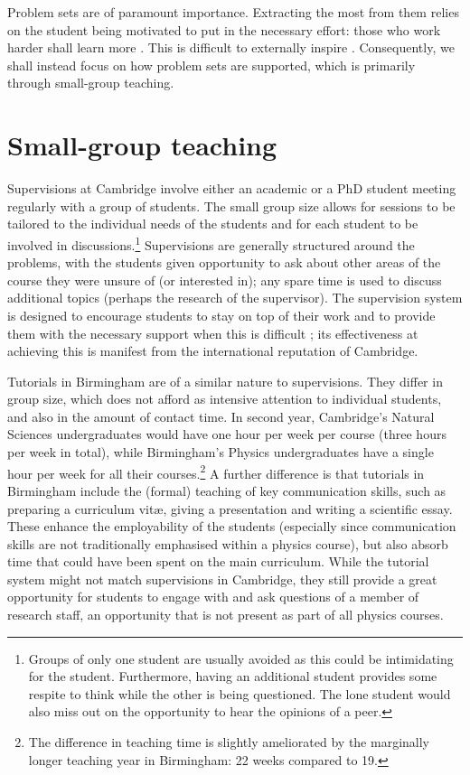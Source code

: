 \documentclass[a4paper, 11pt, twoside]{article}
\begin{document}
Problem sets are of paramount importance. Extracting the most from them relies on the student being motivated to put in the necessary effort: those who work harder shall learn more \citep{Gibbs2015}. This is difficult to externally inspire \citep[cf.][]{Ryan2000}. Consequently, we shall instead focus on how problem sets are supported, which is primarily through small-group teaching.

\section{Small-group teaching}\label{sec:small}

Supervisions at Cambridge involve either an academic or a PhD student meeting regularly with a group of students. The small group size allows for sessions to be tailored to the individual needs of the students and for each student to be involved in discussions.\footnote{Groups of only one student are usually avoided as this could be intimidating for the student. Furthermore, having an additional student provides some respite to think while the other is being questioned. The lone student would also miss out on the opportunity to hear the opinions of a peer.} Supervisions are generally structured around the problems, with the students given opportunity to ask about other areas of the course they were unsure of (or interested in); any spare time is used to discuss additional topics (perhaps the research of the supervisor). The supervision system is designed to encourage students to stay on top of their work and to provide them with the necessary support when this is difficult \citep[case study 12.1]{Gibbs2015}; its effectiveness at achieving this is manifest from the international reputation of Cambridge.

Tutorials in Birmingham are of a similar nature to supervisions. They differ in group size, which does not afford as intensive attention to individual students, and also in the amount of contact time. In second year, Cambridge's Natural Sciences undergraduates would have one hour per week per course (three hours per week in total), while Birmingham's Physics undergraduates have a single hour per week for all their courses.\footnote{The difference in teaching time is slightly ameliorated by the marginally longer teaching year in Birmingham: 22 weeks compared to 19.} A further difference is that tutorials in Birmingham include the (formal) teaching of key communication skills, such as preparing a curriculum vit\ae, giving a presentation and writing a scientific essay. These enhance the employability of the students (especially since communication skills are not traditionally emphasised within a physics course), but also absorb time that could have been spent on the main curriculum. While the tutorial system might not match supervisions in Cambridge, they still provide a great opportunity for students to engage with and ask questions of a member of research staff, an opportunity that is not present as part of all physics courses.
\end{document}
